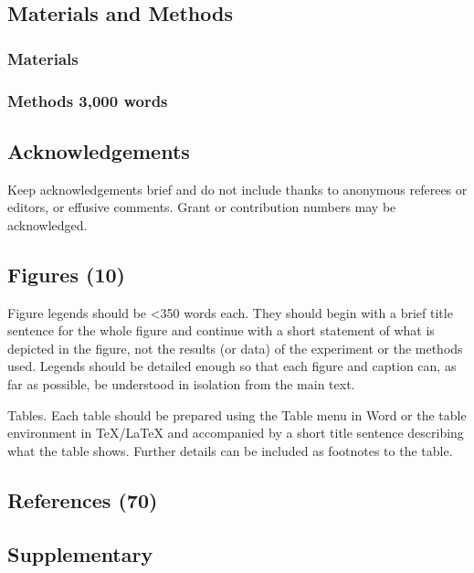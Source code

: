 \documentclass[
  11pt,
]{article}
\begin{document}
\newpage

\subsection{Materials and Methods}\label{materials-and-methods}

\subsubsection{Materials}\label{materials}

\subsubsection{Methods 3,000 words}\label{methods-3000-words}

\subsection{Acknowledgements}\label{acknowledgements}

Keep acknowledgements brief and do not include thanks to anonymous
referees or editors, or effusive comments. Grant or contribution numbers
may be acknowledged.

\subsection{Figures (10)}\label{figures-10}

Figure legends should be \textless350 words each. They should begin with
a brief title sentence for the whole figure and continue with a short
statement of what is depicted in the figure, not the results (or data)
of the experiment or the methods used. Legends should be detailed enough
so that each figure and caption can, as far as possible, be understood
in isolation from the main text.

Tables. Each table should be prepared using the Table menu in Word or
the table environment in TeX/LaTeX and accompanied by a short title
sentence describing what the table shows. Further details can be
included as footnotes to the table.

\subsection{References (70)}\label{references-70}

\subsection{Supplementary}\label{supplementary}
\end{document}

